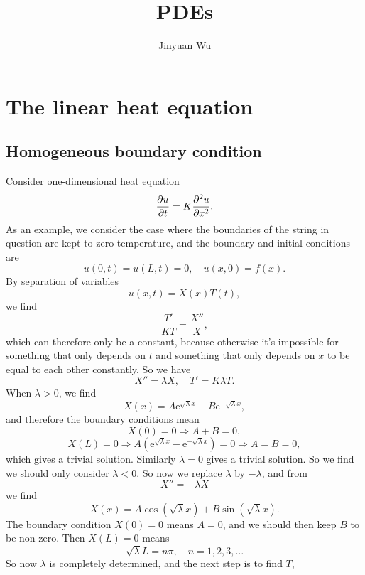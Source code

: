 \documentclass[hyperref, a4paper]{article}
\title{PDEs}
\author{Jinyuan Wu}
\newcommand*{\ee}{\mathrm{e}}
\begin{document}
\maketitle

\section{The linear heat equation}

\subsection{Homogeneous boundary condition}

Consider one-dimensional heat equation 
\begin{equation}
    \pdv{u}{t} = K \pdv[2]{u}{x}.
    \label{eq:heat.homogeneous.bulk}
\end{equation}
As an example, we consider the case where 
the boundaries of the string in question are kept to zero temperature, 
and the boundary and initial conditions are 
\begin{equation}
    u(0, t) = u(L, t) = 0, \quad 
    u(x, 0) = f(x).
    \label{eq:heat.homogeneous.boundary}
\end{equation}
By separation of variables
\begin{equation}
    u(x, t) = X(x) T(t), 
\end{equation}
we find 
\[
    \frac{T'}{K T} = \frac{X''}{X},
\]
which can therefore only be a constant, 
because otherwise it's impossible for something that only depends on $t$ 
and something that only depends on $x$
to be equal to each other constantly.
So we have 
\[
    X'' = \lambda X, \quad T' = K \lambda T.
\]
When $\lambda > 0$, we find 
\[
    X(x) = A \ee^{\sqrt{\lambda} x} + B \ee^{- \sqrt{\lambda} x}, 
\] 
and therefore the boundary conditions mean 
\[
    X(0) = 0 \Rightarrow A + B = 0, 
\]
\[
    X(L) = 0 \Rightarrow A (\ee^{\sqrt{\lambda} x} - \ee^{- \sqrt{\lambda} x}) = 0 \Rightarrow A = B = 0,
\]
which gives a trivial solution.
Similarly $\lambda = 0$ gives a trivial solution.
So we find we should only consider $\lambda < 0$.
So now we replace $\lambda$ by $- \lambda$, 
and from 
\[
    X'' = - \lambda X
\]
we find 
\[
    X(x) = A \cos(\sqrt{\lambda} x) + B \sin(\sqrt{\lambda} x).
\]
The boundary condition $X(0) = 0$ means $A = 0$, 
and we should then keep $B$ to be non-zero.
Then $X(L) = 0$ means 
\[
    \sqrt{\lambda} L = n \pi, \quad n = 1, 2, 3, \dots
\]
So now $\lambda$ is completely determined, 
and the next step is to find $T$, 
\end{document}
